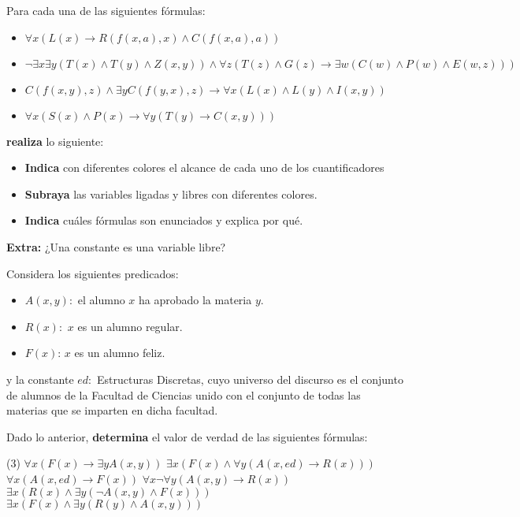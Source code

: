\documentclass[oneside]{style}
\begin{document}
\begin{questions}[label=\protect\circled{\bfseries\arabic*}]
    \question
    {
        Para cada una de las siguientes fórmulas:
        \begin{itemize}
            \item $\forall x (L(x) \rightarrow R(f(x,a), x) \land 
            C(f(x,a), a))$
            \item $\neg \exists x \exists y (T(x) \land T(y) \land Z(x,y)) 
            \land \forall z (T(z) \land G(z) \rightarrow \exists w (C(w) 
            \land P(w) \land E(w,z)))$
            \item $C(f(x,y),z) \land \exists y C(f(y,x),z) \rightarrow 
            \forall x (L(x) \land L(y) \land I(x,y))$
            \item $\forall x (S(x) \land P(x) \rightarrow \forall y 
            (T(y) \rightarrow C(x,y)))$
        \end{itemize}

        \textbf{realiza} lo siguiente:
        \begin{itemize}
            \item \textbf{Indica} con diferentes colores el alcance de cada uno 
            de los cuantificadores  
            \item \textbf{Subraya} las variables ligadas y libres con diferentes 
            colores. 
            \item \textbf{Indica} cuáles fórmulas son enunciados y explica
            por qué. 
        \end{itemize}

        \textbf{Extra:} ¿Una constante es una variable libre? 
    }

    \question
    {
        Considera los siguientes predicados:
        \begin{itemize}
            \item $A(x,y):$ el alumno $x$ ha aprobado la materia $y$. 
            \item $R(x):$ $x$ es un alumno regular. 
            \item $F(x)$: $x$ es un alumno feliz. 
        \end{itemize}

        y la constante $ed: $ Estructuras Discretas, cuyo universo del 
        discurso es el conjunto de alumnos de la Facultad de Ciencias unido 
        con el conjunto de todas las materias que se imparten en dicha facultad.
        
        Dado lo anterior, \textbf{determina} el valor de verdad de las 
        siguientes fórmulas:
        \begin{tasks}(3)
            \task $\forall x (F(x) \rightarrow \exists y A(x,y))$
            \task $\exists x (F(x) \land \forall y (A(x,ed) \rightarrow R(x)))$
            \task $\forall x (A(x,ed) \rightarrow F(x))$
            \task $\forall x \neg \forall y (A(x,y) \rightarrow R(x))$
            \task $\exists x(R(x) \land \exists y (\neg A(x,y) \land F(x)))$
            \task $\exists x (F(x) \land \exists y (R(y) \land A(x,y)))$
        \end{tasks}
    }


\end{questions}
\end{document}
